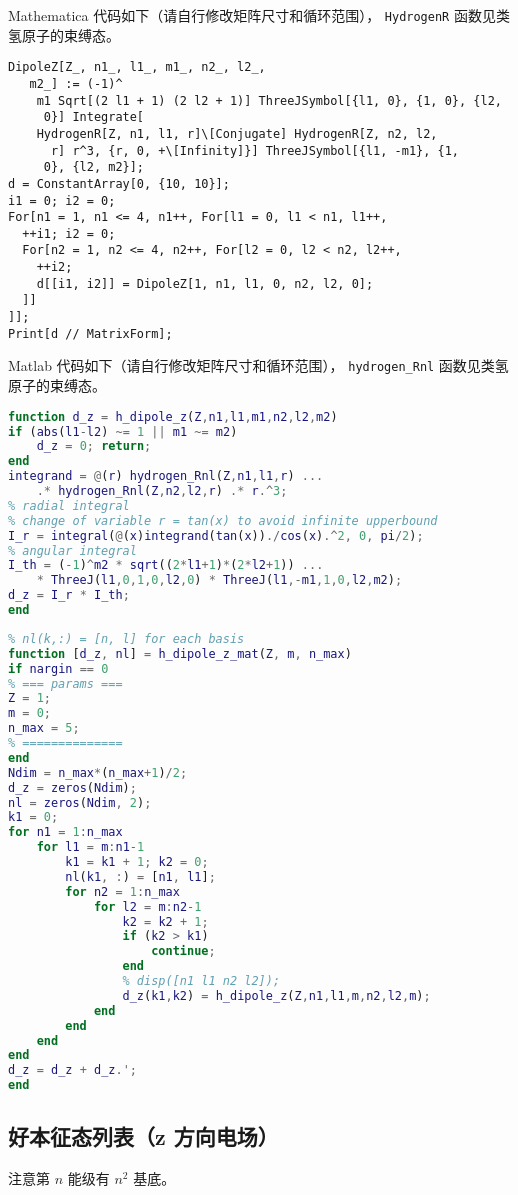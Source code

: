 Mathematica 代码如下（请自行修改矩阵尺寸和循环范围）， \verb|HydrogenR| 函数见类氢原子的束缚态。
\begin{lstlisting}[language=mma,caption=DipoleZ.m]
DipoleZ[Z_, n1_, l1_, m1_, n2_, l2_, 
   m2_] := (-1)^
    m1 Sqrt[(2 l1 + 1) (2 l2 + 1)] ThreeJSymbol[{l1, 0}, {1, 0}, {l2, 
     0}] Integrate[
    HydrogenR[Z, n1, l1, r]\[Conjugate] HydrogenR[Z, n2, l2, 
      r] r^3, {r, 0, +\[Infinity]}] ThreeJSymbol[{l1, -m1}, {1, 
     0}, {l2, m2}];
d = ConstantArray[0, {10, 10}];
i1 = 0; i2 = 0;
For[n1 = 1, n1 <= 4, n1++, For[l1 = 0, l1 < n1, l1++,
  ++i1; i2 = 0;
  For[n2 = 1, n2 <= 4, n2++, For[l2 = 0, l2 < n2, l2++,
    ++i2;
    d[[i1, i2]] = DipoleZ[1, n1, l1, 0, n2, l2, 0];
  ]]
]];
Print[d // MatrixForm];
\end{lstlisting}
Matlab 代码如下（请自行修改矩阵尺寸和循环范围）， \verb`hydrogen_Rnl` 函数见类氢原子的束缚态。
\begin{lstlisting}[language=matlab,caption=h\_dipole\_z.m]
% hydrogen <n1,l1,m1|z|n2,l2,m2>
function d_z = h_dipole_z(Z,n1,l1,m1,n2,l2,m2)
if (abs(l1-l2) ~= 1 || m1 ~= m2)
    d_z = 0; return;
end
integrand = @(r) hydrogen_Rnl(Z,n1,l1,r) ...
    .* hydrogen_Rnl(Z,n2,l2,r) .* r.^3;
% radial integral
% change of variable r = tan(x) to avoid infinite upperbound
I_r = integral(@(x)integrand(tan(x))./cos(x).^2, 0, pi/2);
% angular integral
I_th = (-1)^m2 * sqrt((2*l1+1)*(2*l2+1)) ...
    * ThreeJ(l1,0,1,0,l2,0) * ThreeJ(l1,-m1,1,0,l2,m2);
d_z = I_r * I_th;
end
\end{lstlisting}

\begin{lstlisting}[language=matlab,caption=h\_dipole\_z\_mat.m]
% hydrogen <n1,l1,m1|z|n2,l2,m2> matrix
% nl(k,:) = [n, l] for each basis
function [d_z, nl] = h_dipole_z_mat(Z, m, n_max)
if nargin == 0
% === params ===
Z = 1;
m = 0;
n_max = 5;
% ==============
end
Ndim = n_max*(n_max+1)/2;
d_z = zeros(Ndim);
nl = zeros(Ndim, 2);
k1 = 0;
for n1 = 1:n_max
    for l1 = m:n1-1
        k1 = k1 + 1; k2 = 0;
        nl(k1, :) = [n1, l1];
        for n2 = 1:n_max
            for l2 = m:n2-1
                k2 = k2 + 1;
                if (k2 > k1)
                    continue;
                end
                % disp([n1 l1 n2 l2]);
                d_z(k1,k2) = h_dipole_z(Z,n1,l1,m,n2,l2,m);
            end
        end
    end
end
d_z = d_z + d_z.';
end
\end{lstlisting}

\subsection{好本征态列表（z 方向电场）}\label{sub_HDipM_1}
注意第 $n$ 能级有 $n^2$ 基底。

